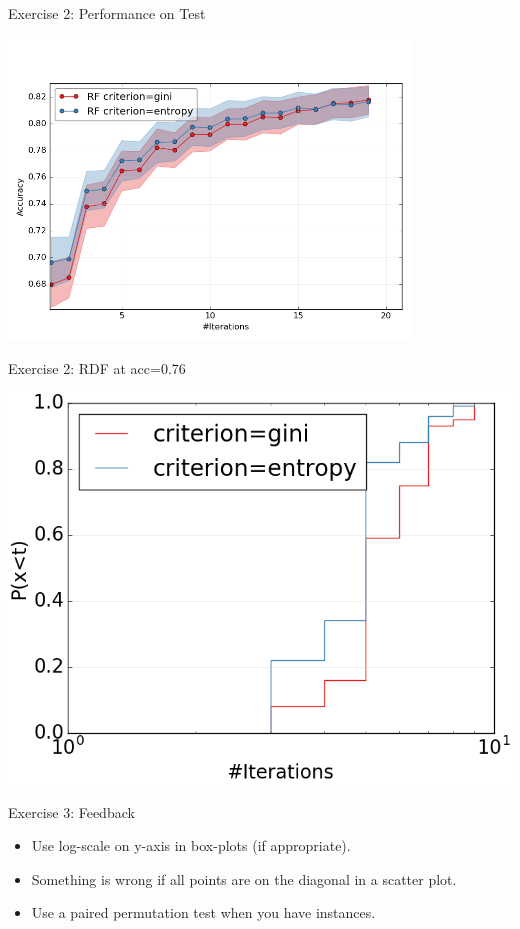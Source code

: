 \documentclass[t]{beamer}
\begin{document}
\begin{frame}[c,fragile]{Exercise 2: Performance on Test}

\centering
\includegraphics[width=0.8\textwidth]{rf_plots/test_mean_comparison}

\end{frame}
\begin{frame}[c,fragile]{Exercise 2: RDF at acc=0.76}

\centering
\includegraphics[width=.6\textwidth]{rf_plots/gini_entropy_cdf}

\end{frame}
\begin{frame}[c,fragile]{Exercise 3: Feedback}

\begin{itemize}
  \item Use log-scale on y-axis in box-plots (if appropriate).
  \medskip
  \item Something is wrong if all points are on the diagonal in a scatter plot.
  \medskip
  \item Use a paired permutation test when you have instances.
\end{itemize}

\end{frame}
\end{document}
